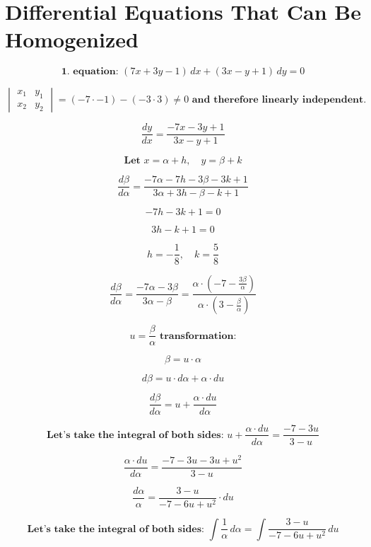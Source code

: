 \documentclass{article}
\begin{document}
\section{Differential Equations That Can Be Homogenized}
    \[
    \textbf{1. equation: } (7x+3y-1) \, dx + (3x-y+1) \, dy = 0
    \]
    
    \[
    \begin{vmatrix}
        x_1 & y_1\\
        x_2 & y_2
    \end{vmatrix}
    =
    \left(-7 \cdot -1\right) - \left(-3 \cdot 3\right) \neq 0 \textbf{ and therefore linearly independent.}
    \]
    
    \[
    \frac{dy}{dx} = \frac{-7x-3y+1}{3x-y+1}
    \]
    
    \[
    \textbf{Let } x = \alpha + h, \quad y = \beta + k
    \]
    
    \[
    \frac{d\beta}{d\alpha} = \frac{-7\alpha - 7h - 3\beta - 3k + 1}{3\alpha + 3h - \beta - k + 1}
    \]
    
    \[
    -7h - 3k + 1 = 0
    \]
    
    \[
    3h -k + 1 = 0
    \]
    
    \[
    h = -\frac{1}{8}, \quad k = \frac{5}{8}
    \]
    
    \[
    \frac{d\beta}{d\alpha} = \frac{-7\alpha - 3\beta}{3\alpha - \beta} = \frac{\alpha \cdot \left(-7 - \frac{3\beta}{\alpha}\right)}{\alpha \cdot \left(3 - \frac{\beta}{\alpha}\right)}
    \]
    
    \[
    u = \frac{\beta}{\alpha} \textbf{ transformation:}
    \]
    
    \[
    \beta = u \cdot \alpha
    \]
    
    \[
    d \beta = u \cdot d \alpha + \alpha \cdot du
    \]
    
    \[
    \frac{d \beta}{d \alpha} = u + \frac{\alpha \cdot du}{d \alpha}
    \]
    
    \[
    \textbf{Let's take the integral of both sides: } u + \frac{\alpha \cdot du}{d\alpha} = \frac{-7 - 3u}{3 - u}
    \]
    
    \[
    \frac{\alpha \cdot du}{d\alpha} = \frac{-7 - 3u - 3u + u^2}{3 - u}
    \]
    
    \[
    \frac{d\alpha}{\alpha} = \frac{3 - u}{-7 - 6u + u^2} \cdot du
    \]
    
    \[
    \textbf{Let's take the integral of both sides: } \int \frac{1}{\alpha} \, d\alpha = \int \frac{3 - u}{-7 - 6u + u^2} \, du
    \]
    
\end{document}
